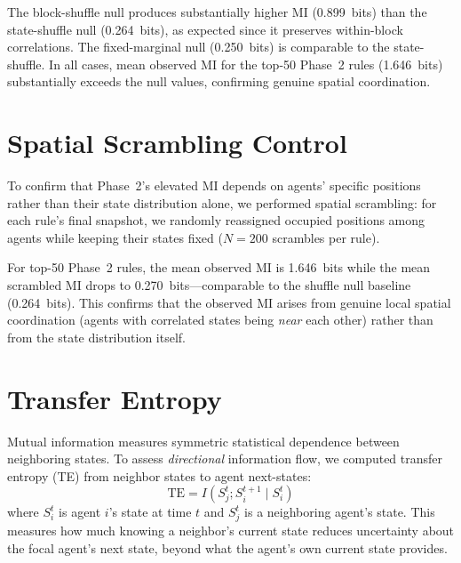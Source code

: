 \documentclass[letterpaper]{article}
\begin{document}
The block-shuffle null produces substantially higher MI (0.899~bits) than
the state-shuffle null (0.264~bits), as expected since it preserves
within-block correlations.  The fixed-marginal null (0.250~bits) is
comparable to the state-shuffle.  In all cases, mean observed MI for the
top-50 Phase~2 rules (1.646~bits) substantially exceeds the null values,
confirming genuine spatial coordination.

\section{Spatial Scrambling Control}
\label{app:spatial_scrambling}

To confirm that Phase~2's elevated MI depends on agents' specific
positions rather than their state distribution alone, we performed
spatial scrambling: for each rule's final snapshot, we randomly
reassigned occupied positions among agents while keeping their states
fixed ($N = 200$ scrambles per rule).

For top-50 Phase~2 rules, the mean observed MI is 1.646~bits while the
mean scrambled MI drops to 0.270~bits---comparable to the shuffle null
baseline (0.264~bits).  This confirms that the observed MI arises from
genuine local spatial coordination (agents with correlated states being
\emph{near} each other) rather than from the state distribution itself.

\section{Transfer Entropy}
\label{app:transfer_entropy}

Mutual information measures symmetric statistical dependence between
neighboring states.  To assess \emph{directional} information flow, we
computed transfer entropy (TE) from neighbor states to agent next-states:
\begin{equation}
  \mathrm{TE} = I(S_j^t ; S_i^{t+1} \mid S_i^t)
\end{equation}
where $S_i^t$ is agent $i$'s state at time $t$ and $S_j^t$ is a
neighboring agent's state.  This measures how much knowing a neighbor's
current state reduces uncertainty about the focal agent's next state,
beyond what the agent's own current state provides.
\end{document}
